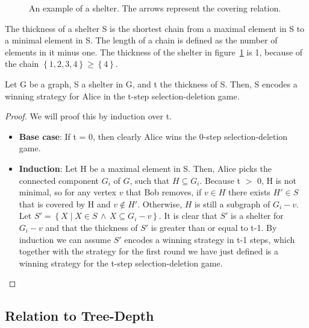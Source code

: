 \begin{figure}[H]

\caption{An example of a shelter. The arrows represent the covering relation. \label{fig:shelter-example}}
\end{figure}
The thickness of a shelter S is the shortest chain from a maximal element in S to a minimal element in S. The length of a chain is defined as the number of elements in it minus one. The thickness of the shelter in figure~\ref{fig:shelter-example} is 1, because of the chain $\left\{ 1, 2, 3, 4\right\} \geq \left\{4\right\}$.
\begin{lemma}
Let G be a graph, S a shelter in G, and t the thickness of S. Then, S encodes a winning strategy for Alice in the t-step selection-deletion game.
\label{lemma:Alice-win}
\end{lemma}
\begin{proof}
We will proof this by induction over t.
\begin{itemize}
  \item \textbf{Base case}: If t = 0, then clearly Alice wins the 0-step selection-deletion game.
  \item \textbf{Induction}: Let H be a maximal element in S. Then, Alice picks the connected component $G_i$ of $G$, such that $H \subseteq G_i$. Because t $>$ 0, H is not minimal, so for any vertex $v$ that Bob removes, if $v \in H$ there exists $H' \in S$ that is covered by H and $v \notin H'$. Otherwise, $H$ is still a subgraph of $G_i - v$. Let $S' =\left\{X \mid X \in S \, \wedge \, X \subseteq G_i - v\right\}$. It is clear that $S'$ is a shelter for $G_i - v$ and that the thickness of $S'$ is greater than or equal to t-1. By induction we can assume $S'$ encodes a winning strategy in t-1 steps, which together with the strategy for the first round we have just defined is a winning strategy for the t-step selection-deletion game.
\end{itemize}
\end{proof}


\subsection{Relation to Tree-Depth}

